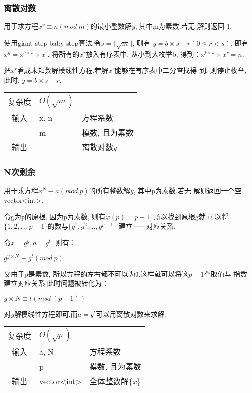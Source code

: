         \subsubsection{离散对数}\small
用于求方程$x^{y} \equiv n(mod\ m)$的最小整数解$y$, 其中m为素数.若无
解则返回-1.

使用giant-step baby-step算法.令$s = \lfloor \sqrt{m} \rfloor$, 则有
$y = b \times s + r(0 \leq r < s)$, 
即有$x^{y} = x^{b \times s} \times x^{r}$.
将所有的$x^{r}$放入有序表中, 从小到大枚举b, 
得到：$x^{b \times s} \times x^{r} = n$.

把$x^{r}$看成未知数解模线性方程.若解$x^{r}$能够在有序表中二分查找得
到, 则停止枚举, 此时, $y = b \times s + r$.
\begin{longtable}{|c|l|l|}
复杂度 & $O(\sqrt{m})$ &  \\
输入 & x, n & 方程系数 \\
 & m & 模数, 且为素数 \\
输出 &  & 离散对数$y$ \\
\end{longtable}



        \subsubsection{N次剩余}\small
用于求方程$x^{N} \equiv a(mod\ p)$的所有整数解$y$, 其中p为素数.若无
解则返回一个空vector<int>.

令g为p的原根, 因为p为素数, 则有$\varphi(p) = p - 1$, 所以找到原根g就
可以将$\{1, 2, ..., p - 1\}$的数与$\{g^{1}, g^{2}, ..., g^{p - 1}\}$
建立一一对应关系.

令$x = g^{y}, a = g^{t}$, 则有：

$g^{y \times N} \equiv g^{t} (mod\ p)$

又由于p是素数, 所以方程的左右都不可以为0.这样就可以将这$p-1$个取值与
指数建立对应关系.此时问题被转化为：

$y \times N \equiv t (mod\ (p-1))$

对$y$解模线性方程即可.而$a = g^{t}$可以用离散对数来求解.

\begin{longtable}{|c|l|l|}
复杂度 & $O(\sqrt{p})$ &  \\
输入 & a, N & 方程系数 \\
 & p & 模数, 且为素数 \\
输出 & vector<int> & 全体整数解$\{x\}$ \\
\end{longtable}



